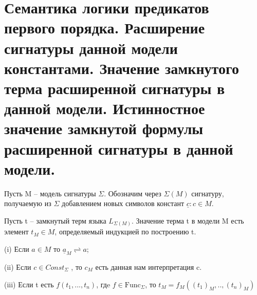 \section{Семантика логики предикатов первого порядка. Расширение сигнатуры
данной модели константами. Значение замкнутого терма расширенной
сигнатуры в данной модели. Истинностное значение замкнутой формулы
расширенной сигнатуры в данной модели.}

Пусть M -- модель сигнатуры $\Sigma$. Обозначим через $ \Sigma(M)$ сигнатуру, получаемую из $  \Sigma$ добавлением
новых символов констант ${\underline {c} : c \in M. \label{formula5} } $


\begin{definition}

	Пусть t -- замкнутый терм языка $L_{\Sigma (M) }$. Значение терма
	t в модели M есть элемент $ t_{M} \in M  $, определяемый индукцией по построению t.

	(i) Если $a \in M $ то  $\underline{a}_{M} \rightleftharpoons a$;

	(ii) Если $ c \in Const_{\Sigma} $ , то $c_{M} $ есть данная нам интерпретация c.

	(iii) Если t есть $f(t_{1},...,t_{n})$, гдe $f \in \mathrm{Func}_{\Sigma}$, то $ t_{M} =
	f_{M}((t_{1})_M,..,(t_{n})_M )$
\end{definition}
